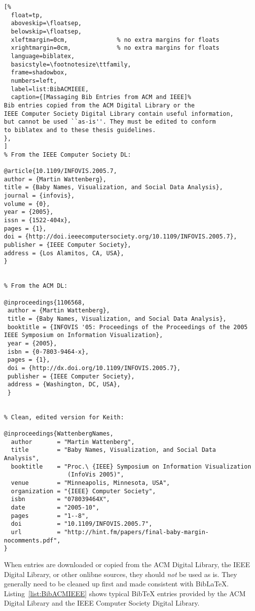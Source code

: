 \begin{samepage}
      \begin{lstlisting}[%
  float=tp,
  aboveskip=\floatsep,
  belowskip=\floatsep,
  xleftmargin=0cm,              % no extra margins for floats
  xrightmargin=0cm,             % no extra margins for floats
  language=biblatex,
  basicstyle=\footnotesize\ttfamily,
  frame=shadowbox,
  numbers=left,
  label=list:BibACMIEEE,
  caption={[Massaging Bib Entries from ACM and IEEE]%
Bib entries copied from the ACM Digital Library or the
IEEE Computer Society Digital Library contain useful information,
but cannot be used ``as-is''. They must be edited to conform
to biblatex and to these thesis guidelines.
},
]
% From the IEEE Computer Society DL:

@article{10.1109/INFOVIS.2005.7,
author = {Martin Wattenberg},
title = {Baby Names, Visualization, and Social Data Analysis},
journal = {infovis},
volume = {0},
year = {2005},
issn = {1522-404x},
pages = {1},
doi = {http://doi.ieeecomputersociety.org/10.1109/INFOVIS.2005.7},
publisher = {IEEE Computer Society},
address = {Los Alamitos, CA, USA},
}


% From the ACM DL:

@inproceedings{1106568,
 author = {Martin Wattenberg},
 title = {Baby Names, Visualization, and Social Data Analysis},
 booktitle = {INFOVIS '05: Proceedings of the Proceedings of the 2005 IEEE Symposium on Information Visualization},
 year = {2005},
 isbn = {0-7803-9464-x},
 pages = {1},
 doi = {http://dx.doi.org/10.1109/INFOVIS.2005.7},
 publisher = {IEEE Computer Society},
 address = {Washington, DC, USA},
 }


% Clean, edited version for Keith:

@inproceedings{WattenbergNames,
  author       = "Martin Wattenberg",
  title        = "Baby Names, Visualization, and Social Data Analysis",
  booktitle    = "Proc.\ {IEEE} Symposium on Information Visualization
                  (InfoVis 2005)",
  venue        = "Minneapolis, Minnesota, USA",
  organization = "{IEEE} Computer Society",
  isbn         = "078039464X",
  date         = "2005-10",
  pages        = "1--8",
  doi          = "10.1109/INFOVIS.2005.7",
  url          = "http://hint.fm/papers/final-baby-margin-nocomments.pdf",
}

\end{lstlisting}
\end{samepage}


When  entries are downloaded or copied from the ACM
Digital Library, the IEEE Digital Library, or other onlibne sources,
they should \emph{not} be used as is. They generally need to be
cleaned up first and made consistent with BibLaTeX.
Listing~\ref{list:BibACMIEEE} shows typical BibTeX entries provided by
the ACM Digital Library and the IEEE Computer Society Digital Library.



